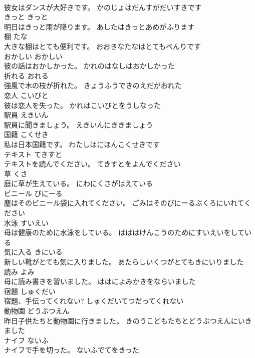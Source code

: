 \documentclass[8pt]{extreport}
\begin{document}
\begin{CJK}{UTF8}{min}
\\	彼女はダンスが大好きです。	かのじょはだんすがだいすきです	
\\	きっと	きっと	
\\	明日はきっと雨が降ります。	あしたはきっとあめがふります	
\\	棚	たな	
\\	大きな棚はとても便利です。	おおきなたなはとてもべんりです	
\\	おかしい	おかしい	
\\	彼の話はおかしかった。	かれのはなしはおかしかった	
\\	折れる	おれる	
\\	強風で木の枝が折れた。	きょうふうできのえだがおれた	
\\	恋人	こいびと	
\\	彼は恋人を失った。	かれはこいびとをうしなった	
\\	駅員	えきいん	
\\	駅員に聞きましょう。	えきいんにききましょう	
\\	国籍	こくせき	
\\	私は日本国籍です。	わたしはにほんこくせきです	
\\	テキスト	てきすと	
\\	テキストを読んでください。	てきすとをよんでください	
\\	草	くさ	
\\	庭に草が生えている。	にわにくさがはえている	
\\	ビニール	びにーる	
\\	塵はそのビニール袋に入れてください。	ごみはそのびにーるぶくろにいれてください	
\\	水泳	すいえい	
\\	母は健康のために水泳をしている。	はははけんこうのためにすいえいをしている	
\\	気に入る	きにいる	
\\	新しい靴がとても気に入りました。	あたらしいくつがとてもきにいりました	
\\	読み	よみ	
\\	母に読み書きを習いました。	ははによみかきをならいました	
\\	宿題	しゅくだい	
\\	宿題、手伝ってくれない?	しゅくだいてつだってくれない	
\\	動物園	どうぶつえん	
\\	昨日子供たちと動物園に行きました。	きのうこどもたちとどうぶつえんにいきました	
\\	ナイフ	ないふ	
\\	ナイフで手を切った。	ないふでてをきった	

\end{CJK}
\end{document}
